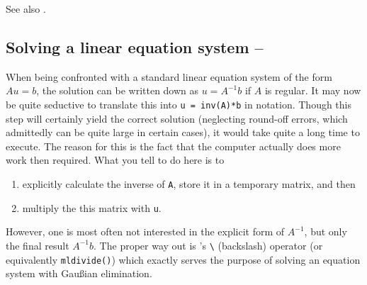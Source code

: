 See also \cite{Mathworks:2001:MIM}.



% 
% 


\subsection{Solving a linear equation system -- \cleansymbol\cleansymbol\fastsymbol\fastsymbol\fastsymbol}
When being confronted with a standard linear equation system of the form $Au=b$, the solution can be written down as $u = A^{-1}b$ if $A$ is regular. It may now be quite seductive to translate this into \lstinline!u = inv(A)*b! in \matlab{} notation. Though this step will certainly yield the correct solution (neglecting round-off errors, which admittedly can be quite large in certain cases), it would take quite a long time to execute. The reason for this is the fact that the computer actually does more work then required. What you tell \matlab{} to do here is to
\begin{enumerate}
\item explicitly calculate the inverse of \lstinline!A!, store it in a temporary matrix, and then
\item multiply the this matrix with \lstinline!u!.
\end{enumerate}
However, one is most often not interested in the explicit form of $A^{-1}$, but only the final result $A^{-1}b$. The proper way out is \matlab{}'s \lstinline!\! (backslash) operator (or equivalently \lstinline!mldivide()!) which exactly serves the purpose of solving an equation system with Gau{\ss}ian elimination.

